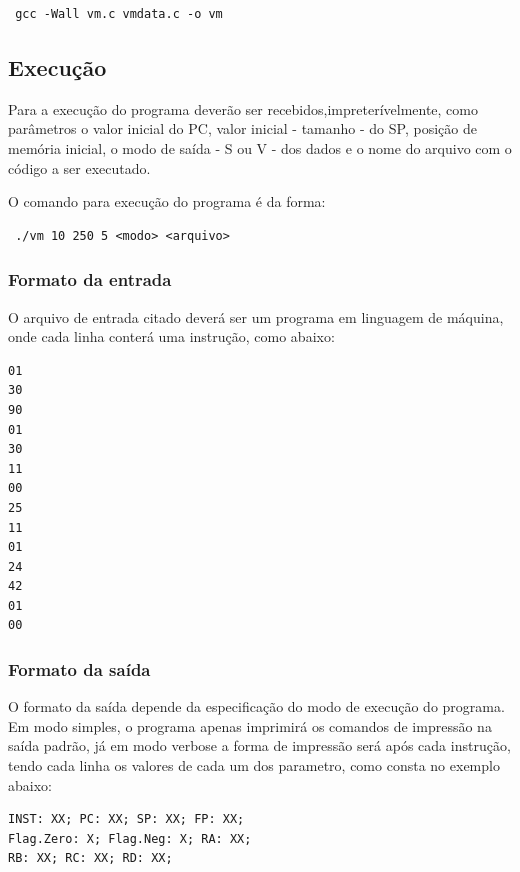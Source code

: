 \documentclass[12pt]{article}
\begin{document}
\begin{footnotesize}
\begin{verbatim} gcc -Wall vm.c vmdata.c -o vm \end{verbatim}
\end{footnotesize}

\subsection{Execução}

Para a execução do programa deverão ser recebidos,impreterívelmente, como parâmetros o valor
inicial do PC, valor inicial - tamanho - do SP, posição de memória inicial, o
modo de saída - S ou V - dos dados e o nome do arquivo com o código a ser
executado.

O comando para execução do programa é da forma: \\

\begin{footnotesize}
\begin{verbatim} ./vm 10 250 5 <modo> <arquivo> \end{verbatim}
\end{footnotesize}

\subsubsection{Formato da entrada}
O arquivo de entrada citado deverá ser um programa em linguagem de máquina,
onde cada linha conterá uma instrução, como abaixo:

\begin{footnotesize}
\begin{verbatim}
01
30
90
01
30
11
00
25
11
01
24
42
01
00
\end{verbatim}
\end{footnotesize}

\subsubsection{Formato da saída}
O formato da saída depende da especificação do modo de execução do programa.\\
Em modo simples, o programa apenas imprimirá os comandos de impressão na saída
padrão, já em modo verbose a forma de impressão será após cada instrução, tendo
cada linha os valores de cada um dos parametro, como consta no exemplo abaixo:

\begin{footnotesize}
\begin{verbatim}
INST: XX; PC: XX; SP: XX; FP: XX; 
Flag.Zero: X; Flag.Neg: X; RA: XX; 
RB: XX; RC: XX; RD: XX;
\end{verbatim}
\end{footnotesize}
\end{document}
